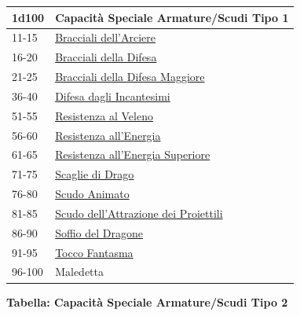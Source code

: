 \begin{multicols}{2}
{\medskip

{\small\begin{tabularx}{\linewidth}{ll}
		\toprule
\rowcolor{gray!20}\textbf{1d100} & \textbf{Capacità Speciale Armature/Scudi Tipo 1}\\
\toprule
11-15& \hyperlink{Bracciali dell'Arciere}{Bracciali dell'Arciere}\\
\rowcolor{gray!20}16-20& \hyperlink{Bracciali della Difesa}{Bracciali della Difesa}\\
21-25& \hyperlink{Braccialidella Difesa Maggiore}{Bracciali della Difesa Maggiore}\\
\rowcolor{gray!20}36-40& \hyperlink{Difesa dagli Incantesimi}{Difesa dagli Incantesimi}\\
51-55& \hyperlink{Resistenza al Veleno}{Resistenza al Veleno}\\
\rowcolor{gray!20}56-60& \hyperlink{Resistenza all'Energia}{Resistenza all'Energia}\\
61-65& \hyperlink{Resistenza all'Energia Superiore}{Resistenza all'Energia Superiore}\\
\rowcolor{gray!20}71-75& \hyperlink{Scaglie di Drago}{Scaglie di Drago}\\
76-80& \hyperlink{Scudo Animato}{Scudo Animato}\\
\rowcolor{gray!20}81-85& \hyperlink{Scudo dell'Attrazione dei Proiettili}{Scudo dell'Attrazione dei Proiettili}\\
86-90& \hyperlink{Soffio del Dragone}{Soffio del Dragone}\\
\rowcolor{gray!20}91-95& \hyperlink{Tocco Fantasma}{Tocco Fantasma}\\
96-100 & Maledetta\\
\end{tabularx}}


\textbf{Tabella: Capacità Speciale Armature/Scudi Tipo 2}\hypertarget{Capacità Speciale Armature / Scudi Tipo 2}{}

\medskip

}
\end{multicols}

